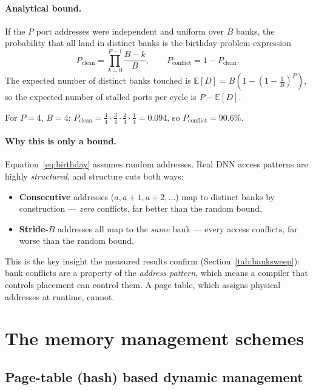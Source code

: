 \documentclass[11pt,a4paper]{article}
\begin{document}
\paragraph{Analytical bound.} If the $P$ port addresses were independent and
uniform over $B$ banks, the probability that all land in distinct banks is the
birthday-problem expression
\begin{equation}
  P_{\text{clean}} = \prod_{k=0}^{P-1}\frac{B-k}{B},
  \qquad
  P_{\text{conflict}} = 1 - P_{\text{clean}} .
  \label{eq:birthday}
\end{equation}
The expected number of distinct banks touched is
$\mathbb{E}[D] = B\left(1-\left(1-\tfrac{1}{B}\right)^{P}\right)$, so the
expected number of stalled ports per cycle is $P - \mathbb{E}[D]$.

For $P=4$, $B=4$: $P_{\text{clean}} = \tfrac{4}{4}\cdot\tfrac{3}{4}\cdot
\tfrac{2}{4}\cdot\tfrac{1}{4} = 0.094$, so $P_{\text{conflict}} = 90.6\%$.

\paragraph{Why this is only a bound.} Equation~\eqref{eq:birthday} assumes
random addresses. Real DNN access patterns are highly \emph{structured}, and
structure cuts both ways:
\begin{itemize}[leftmargin=1.4em,itemsep=2pt]
  \item \textbf{Consecutive} addresses ($a, a{+}1, a{+}2, \dots$) map to
        distinct banks by construction --- \emph{zero} conflicts, far better
        than the random bound.
  \item \textbf{Stride-$B$} addresses all map to the \emph{same} bank ---
        every access conflicts, far worse than the random bound.
\end{itemize}
This is the key insight the measured results confirm (Section~\ref{tab:banksweep}):
bank conflicts are a property of the \emph{address pattern}, which means a
compiler that controls placement can control them. A page table, which assigns
physical addresses at runtime, cannot.

\section{The memory management schemes}

\subsection{Page-table (hash) based dynamic management}
\end{document}
